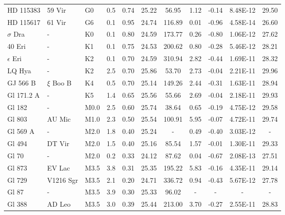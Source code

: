 \begin{landscape}
\begin{center}
\begin{longtable}{l l l c c c c c c c c}
        \hline
        \endlastfoot
%
HD 115383    & 	59 Vir & G0	  &  0.5	& 0.74 &	25.22 &	56.95  & 1.12 &	-0.14 &	8.48E-12 &	29.50 \\
HD 115617    & 	61 Vir & G6	  &  0.1	& 0.95 &	24.74 &	116.89 & 0.01 &	-0.96 &	4.58E-14 &	26.60 \\
$\sigma$ Dra & 	-	   & K0	  &  0.1	& 0.80 &	24.59 &	173.77 & 0.26 &	-0.80 &	1.06E-12 &	27.62 \\
40 Eri	     &  -	   & K1	  &  0.1	& 0.75 &	24.53 &	200.62 & 0.80 & -0.28 &	5.46E-12 &	28.21 \\
$\epsilon$ Eri&  -	   & K2	  &  0.1	& 0.70 &	24.59 &	310.94 & 2.82 &	-0.44 &	1.69E-11 &	28.32 \\
LQ Hya	     &  -	   & K2	  &  2.5	& 0.70 &	25.86 &	53.70  & 2.73 &	-0.04 &	2.21E-11 &	29.96 \\
GJ 566 B     &$\xi$ Boo B& K4 &  0.5	& 0.70 &	25.14 &	149.26 & 2.44 &	-0.31 &	1.63E-11 &	28.94 \\
Gl 171.2 A   & 	-	   & K5	  &  1.4	& 0.65 &	25.56 &	55.66  & 2.69 &	-0.04 &	2.18E-11 &	29.93 \\
Gl 182	     &  -      & M0.0 &  2.5	& 0.60 &	25.74 &	38.64  & 0.65 &	-0.19 &	4.75E-12 &	29.58 \\
Gl 803	     &  AU Mic & M1.0 &  2.3	& 0.50 &	25.54 &	100.91 & 5.95 &	-0.07 &	4.72E-11 &	29.74 \\
Gl 569 A	 &  -	   & M2.0 &  1.8	& 0.40 &	25.24 &	-	   & 0.49 &	-0.40 &	3.03E-12 &    -   \\
Gl 494	     &  DT Vir & M2.0 &  1.5	& 0.40 &	25.16 &	85.54  & 1.57 &	-0.01 &	1.30E-11 &	29.33 \\
Gl 70	     &  -	   & M2.0 &  0.2	& 0.33 &	24.12 &	87.62  & 0.04 &	-0.67 &	2.08E-13 &	27.51 \\
Gl 873	     &  EV Lac & M3.5 &  3.8	& 0.31 &	25.35 &	195.22 & 5.83 &	-0.16 &	4.35E-11 &	29.14 \\
Gl 729	     &V1216 Sgr& M3.5 &  2.1	& 0.20 &	24.71 &	336.72 & 0.94 &	-0.43 &	5.67E-12 &	27.78 \\
Gl 87	     &  -	   & M3.5 &  3.9	& 0.30 &	25.33 &	96.02  & -    &   -	  &   -	     &    -   \\
Gl 388	     &  AD Leo & M3.5 &  3.0	& 0.39 &	25.44 &	213.00 & 3.70 &	-0.27 &	2.55E-11 &	28.83 \\

\end{longtable}
\end{center}
\end{landscape}
